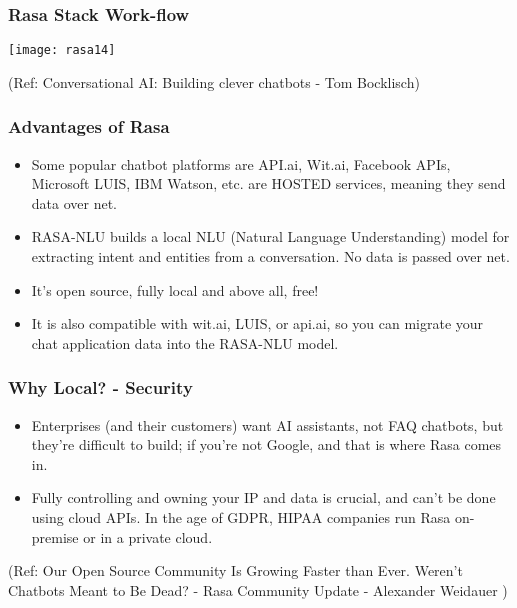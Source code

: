 \begin{frame}[fragile]\frametitle{Rasa Stack Work-flow}


\begin{center}
\texttt{[image: rasa14]}
\end{center}


{\tiny (Ref: Conversational AI: Building clever chatbots - Tom Bocklisch)}

\end{frame}


 \begin{frame}[fragile]\frametitle{Advantages of Rasa}
\begin{itemize}
\item Some popular chatbot platforms are API.ai, Wit.ai, Facebook APIs, Microsoft LUIS, IBM Watson, etc. are HOSTED services, meaning they send data over net.
\item RASA-NLU builds a local NLU (Natural Language Understanding) model for extracting intent and entities from a conversation. No data is passed over net.
\item It's open source, fully local and above all, free! 
\item It is also compatible with wit.ai, LUIS, or api.ai, so you can migrate your chat application data into the RASA-NLU model.
\end{itemize}
\end{frame}

 \begin{frame}[fragile]\frametitle{Why Local? - Security}
\begin{itemize}
\item Enterprises (and their customers) want AI assistants, not FAQ chatbots, but they're difficult to build; if you're not Google, and that is where Rasa comes in.
\item Fully controlling and owning your IP and data is crucial, and can't be done using cloud APIs. In the age of GDPR, HIPAA companies run Rasa on-premise or in a private cloud.
\end{itemize}

{\tiny (Ref: Our Open Source Community Is Growing Faster than Ever. Weren't Chatbots Meant to Be Dead? - Rasa Community Update - Alexander Weidauer )}
\end{frame}

